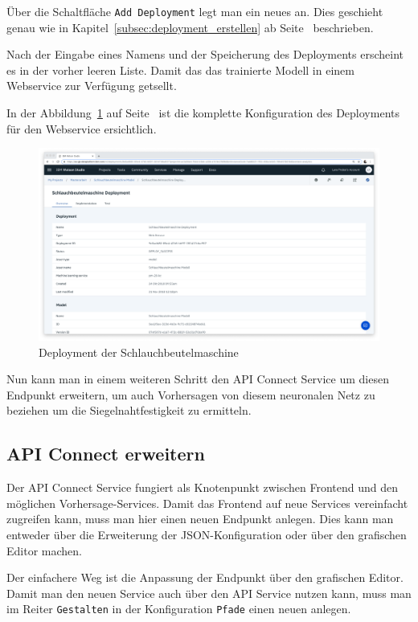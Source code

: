 Über die Schaltfläche \texttt{Add Deployment} legt man ein neues an. Dies geschieht genau wie in
Kapitel~\ref{subsec:deployment_erstellen} ab Seite~\pageref{subsec:deployment_erstellen} beschrieben.

Nach der Eingabe eines Namens und der Speicherung des Deployments erscheint es in der vorher leeren Liste. Damit das das
trainierte Modell in einem Webservice zur Verfügung getsellt.

In der Abbildung~\ref{fig:siegelmaschinen_deployment} auf Seite~\pageref{fig:siegelmaschinen_deployment} ist die
komplette Konfiguration des Deployments für den Webservice ersichtlich.

\begin{figure}[h]
    \centering
    \includegraphics[width=\textwidth]{images/kapitel_5/vffs_deployment.png}
    \caption{Deployment der Schlauchbeutelmaschine}
    \label{fig:siegelmaschinen_deployment}
\end{figure}

Nun kann man in einem weiteren Schritt den API Connect Service um diesen Endpunkt erweitern, um auch Vorhersagen von
diesem neuronalen Netz zu beziehen um die Siegelnahtfestigkeit zu ermitteln.

\subsection{API Connect erweitern}
Der API Connect Service fungiert als Knotenpunkt zwischen Frontend und den möglichen Vorhersage-Services. Damit das
Frontend auf neue Services vereinfacht zugreifen kann, muss man hier einen neuen Endpunkt anlegen. Dies kann man
entweder über die Erweiterung der JSON-Konfiguration oder über den grafischen Editor machen.

Der einfachere Weg ist die Anpassung der Endpunkt über den grafischen Editor. Damit man den neuen Service auch über den
API Service nutzen kann, muss man im Reiter \texttt{Gestalten} in der Konfiguration \texttt{Pfade} einen neuen anlegen.

